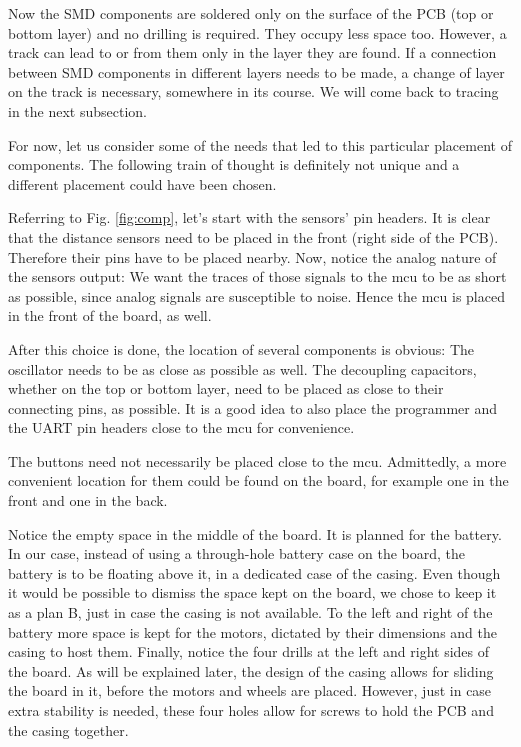 Now the SMD components are soldered only on the surface of the PCB (top or bottom layer) and no drilling is required. They occupy less space too. However, a track can lead to or from them only in the layer they are found. If a connection between SMD components in different layers needs to be made, a change of layer on the track is necessary, somewhere in its course. We will come back to tracing in the next subsection. 

\FloatBarrier
\vspace{1cm}

For now, let us consider some of the needs that led to this particular placement of components. The following train of thought is definitely not unique and a different placement could have been chosen.

Referring to Fig. \ref{fig:comp}, let's start with the sensors' pin headers. It is clear that the distance sensors need to  be placed in the front (right side of the PCB). Therefore their pins have to be placed nearby. Now, notice the analog nature of the sensors output: We want the traces of those signals to the mcu to be as short as possible, since analog signals are susceptible to noise. Hence the mcu is placed in the front of the board, as well.

After this choice is done, the location of several components is obvious: The oscillator needs to be as close as possible as well. The decoupling capacitors, whether on the top or bottom layer, need to be placed as close to their connecting pins, as possible. It is a good idea to also place the programmer and the UART pin headers close to the mcu for convenience.

The buttons need not necessarily be placed close to  the mcu. Admittedly, a more convenient location for them could be found on the board, for example one in the front and one in the back.

Notice the empty space in the middle of the board. It is planned for the battery. In our case, instead of using a through-hole battery case on the board, the battery is to be floating above it, in a dedicated case of the casing. Even though it would be possible to dismiss the space kept on the board, we chose to keep it as a plan B, just in case the casing is not available. To the left and right of the battery more space is kept for the motors, dictated by their dimensions and the casing to host them. Finally, notice the four drills at the left and right sides of the board. As will be explained later, the design of the casing allows for sliding the board in it, before the motors and wheels are placed. However, just in case extra stability is needed, these four holes allow for screws to hold the PCB and the casing together.

